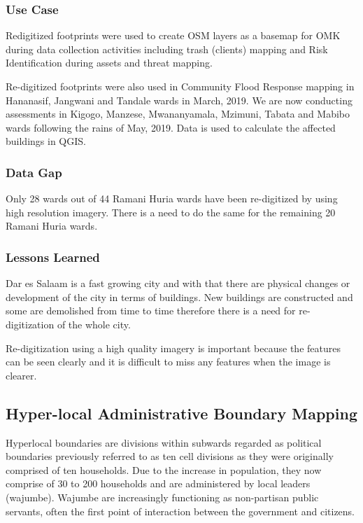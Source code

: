 \documentclass[a4paper,12pt,twoside]{article}
\begin{document}
\subsubsection{Use Case}
Redigitized footprints were used to create OSM layers as a basemap for OMK during data collection activities including trash (clients) mapping and Risk Identification during assets and threat mapping. 

Re-digitized footprints were also used in Community Flood Response mapping in Hananasif, Jangwani and Tandale wards in March, 2019. We are now conducting assessments in Kigogo, Manzese, Mwananyamala, Mzimuni, Tabata and Mabibo wards following the rains of May, 2019. Data is used to calculate the affected buildings in QGIS.


\subsubsection{Data Gap}
Only 28 wards out of 44 Ramani Huria wards have been re-digitized by using high resolution imagery. There is a need to do the same for the remaining 20 Ramani Huria wards.

\subsubsection{Lessons Learned}
Dar es Salaam is a fast growing city and with that there are physical changes or development of the city in terms of buildings. New buildings are constructed and some are demolished from time to time therefore there is a need for re-digitization of the whole city.

Re-digitization using a high quality imagery is important because the features can be seen clearly and it is difficult to miss any features when the image is clearer.

\newpage
\subsection{Hyper-local Administrative Boundary Mapping}
Hyperlocal boundaries are divisions within subwards regarded as political boundaries previously referred to as ten cell divisions as they were originally comprised of ten households.
Due to the increase in population, they now comprise of 30 to 200 households and are administered by local leaders (wajumbe). Wajumbe are increasingly functioning as non-partisan public servants, often the first point of interaction between the government and citizens.
\end{document}
